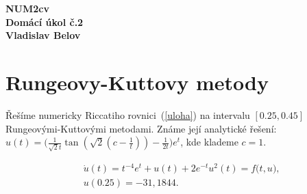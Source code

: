 \documentclass[11pt,american,czech]{article}
\begin{document}
\def\documentdate{24. dubna 2017}
\begin{flushright}
\textbf{	NUM2cv \\
	Domácí úkol č.2 \\
	Vladislav Belov}
\end{flushright}

\section{Rungeovy-Kuttovy metody}

Řešíme numericky Riccatiho rovnici~(\ref{uloha}) na intervalu $[0.25, 0.45]$ Rungeovými-Kuttovými metodami. Známe její analytické řešení: $u(t)=\big(\frac{1}{\sqrt{2}t}\tan{(\sqrt{2}(c-\frac{1}{t}))}-\frac{1}{2t}\big)e^{t}$, kde klademe $c=1$.

\begin{equation} \label{uloha}
	\begin{split}
		&\dot{u}(t)=t^{-4}e^{t}+u(t)+2e^{-t}u^{2}(t) = f\big(t, u\big), \\
		&u(0.25)=-31,1844.
	\end{split}
\end{equation}
\end{document}
